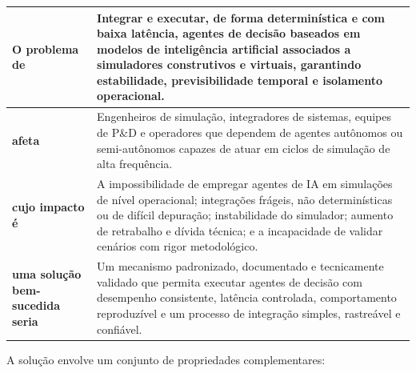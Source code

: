 \begin{table}[h]
    \begin{tabular}{|p{}|p{}|}
        \hline
            \textbf{O problema de} &
            Integrar e executar, de forma determinística e com baixa latência, agentes de decisão baseados em modelos de inteligência artificial associados a simuladores construtivos e virtuais, garantindo estabilidade, previsibilidade temporal e isolamento operacional. \\
        \hline
            \textbf{afeta} &
            Engenheiros de simulação, integradores de sistemas, equipes de P\&D e operadores que dependem de agentes autônomos ou semi-autônomos capazes de atuar em ciclos de simulação de alta frequência. \\
        \hline
            \textbf{cujo impacto é} &
            A impossibilidade de empregar agentes de IA em simulações de nível operacional; integrações frágeis, não determinísticas ou de difícil depuração; instabilidade do simulador; aumento de retrabalho e dívida técnica; e a incapacidade de validar cenários com rigor metodológico. \\
        \hline
            \textbf{uma solução bem-sucedida seria} &
            Um mecanismo padronizado, documentado e tecnicamente validado que permita executar agentes de decisão com desempenho consistente, latência controlada, comportamento reproduzível e um processo de integração simples, rastreável e confiável. \\
        \hline
    \end{tabular}
\end{table}

A solução envolve um conjunto de propriedades complementares:

